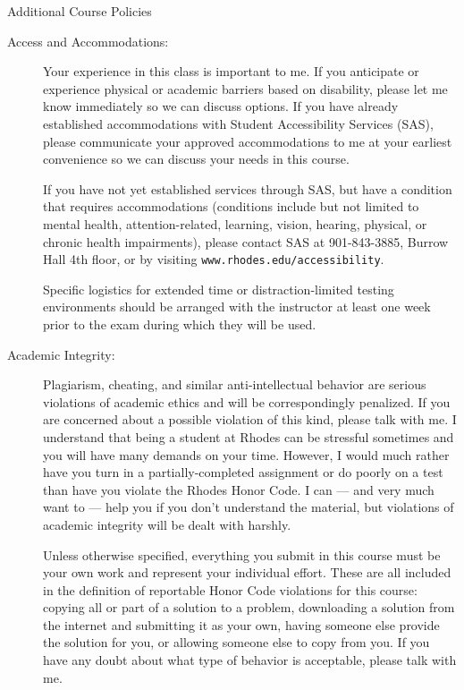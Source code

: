 \documentclass [letterpaper,11pt]{article}
\begin{document}
\begin{center}
\Large Additional Course Policies
\end{center}

\begin{description}

\item[Access and Accommodations:]
Your experience in this class is important to me.  If you anticipate or experience physical or academic barriers based on disability, please let me know immediately so we can discuss options.  If you have already established accommodations with Student Accessibility Services (SAS), please communicate your approved accommodations to me at your earliest convenience so we can discuss your needs in this course.

If you have not yet established services through SAS, but have a condition that requires accommodations (conditions include but not limited to mental health, attention-related, learning, vision, hearing, physical, or chronic health impairments), please contact SAS at 901-843-3885, Burrow Hall 4th floor, or by visiting  \texttt{www.rhodes.edu/accessibility}.

Specific logistics for extended time or distraction-limited testing environments should be arranged with the instructor 
at least one week prior to the exam during which they 
will be used.

  \item[Academic Integrity:]
   Plagiarism, cheating, and similar anti-intellectual behavior are serious violations of academic ethics and will be correspondingly penalized. If you are concerned about a possible violation of this kind, please talk with me.  I understand that being a student at Rhodes 
can be stressful sometimes and you will have many demands on your time.  However, I would
much rather have you turn in a partially-completed assignment or do poorly on a test than
have you violate the Rhodes Honor Code.  I can --- and very much want to --- help you if you don't understand the material, but violations of academic integrity will be dealt with harshly.
   
Unless otherwise specified, everything you submit in this course must be your own work and represent
your individual effort.  These are all included in the definition of reportable Honor Code violations for this course:
copying all or part of a solution to a problem, downloading a solution from the internet and submitting it as your own, having someone else provide the solution for you, or allowing someone else to copy from you.    If you have any doubt about what type of behavior is acceptable, please talk with me.


\end{description}
\end{document}
